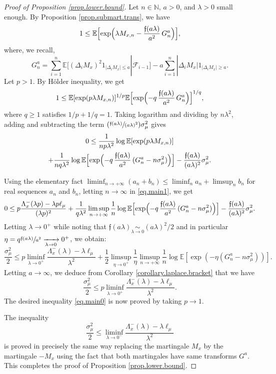 \documentclass[10pt]{amsart}
\newcommand{\Psfrac}[2]{(\sfrac{#1}{#2})}
\theoremstyle{plain}
\theoremstyle{definition}
\newcommand\E{\mathbb{E}}
\newcommand\N{\mathbb{N}}
\begin{document}
\begin{proof}[Proof of Proposition \ref{prop.lower.bound}]
Let $n\in \N$, $a>0$, and $\lambda>0$ small enough. By Proposition \ref{prop.submart.trans}, we have
\[
1\leq \E\Bigl[\exp\Bigl(\lambda M_{x,n} - \frac{\mathfrak{f}(a\lambda)}{a^2}\, G_n^a\Bigr)\Bigr],
\]
where, we recall,
\[
G_n^a=\sum_{i=1}^n \mathbb{E}[(\Delta_i M_x)^2 1_{|\Delta_i M_x| \leq a}| \mathcal{F}_{i-1}]-a\sum_{i=1}^n |\Delta_iM_x| 1_{|\Delta_i M_x| \geq a}.
\]
Let $p> 1$. By Hölder inequality, we get
\[
1\leq
\E[\exp(p\lambda M_{x,n})]^{1/p}
\E\Bigl[\exp\Bigl(- q\,\frac{\mathfrak{f}(a\lambda)}{a^2}\,G_n^a\Bigr)\Bigr]^{1/q},
\]
where $q \geq 1$ satisfies $1/p+1/q=1$.
Taking logarithm and dividing by $n\lambda^2$, adding and subtracting the term $\Psfrac{\mathfrak{f}(a\lambda)}{(a\lambda)^2}\sigma_{\mu}^2$ gives
\begin{multline}\label{eq.main1}
0\leq \frac{1}{n p \lambda^2}\log \E[\exp(p\lambda M_{x,n})]\\
+ \frac{1}{nq \lambda^2}\log \E\Bigl[\exp\Bigl(- q\,\frac{\mathfrak{f}(a\lambda)}{a^2}\, (G_n^a-n\sigma_{\mu}^2)\Bigr)\Bigr]-\frac{\mathfrak{f}(a\lambda)}{(a\lambda)^2}\sigma_{\mu}^2.
\end{multline}

Using the elementary fact $\liminf_{n\to +\infty}(a_n+b_n)\leq \liminf_n a_n + \limsup_n b_n$ for real sequences $a_n$ and $b_n$, letting $n \to \infty$ in \eqref{eq.main1}, we get
\[
0\leq p \frac{\Lambda_x^-(\lambda p)- \lambda p\ell_{\mu}}{(\lambda p)^2} + \frac{1}{ q\lambda^2}\limsup_{n\to +\infty} \frac{1}{n}\log \E\Bigl[\exp\Bigl(- q\,\frac{\mathfrak{f}(a\lambda)}{a^2}\, (G_n^a-n\sigma_{\mu}^2)\Bigr)\Bigr]- \frac{\mathfrak{f}(a\lambda)}{(a\lambda)^2}\sigma_{\mu}^2.
\]
Letting $\lambda\to 0^+$ while noting that $\mathfrak{f}(a\lambda) \underset{\lambda\to 0}{\sim} (a\lambda)^2/2$ and in particular $\eta=q\sfrac{\mathfrak{f}(a\lambda)}{a^2}\allowbreak \xrightarrow[\lambda \to 0]{} 0^+$, we obtain:
\[
\frac{\sigma_{\mu}^2}{2}\leq p \liminf_{\lambda\to 0^+}{\frac{\Lambda_x^-(\lambda)-\lambda \ell_{\mu}}{\lambda^2}}
+ \frac{1}{2}\limsup_{\eta\to 0^+}\frac{1}{\eta}
\limsup_{n\to +\infty}\frac{1}{n}\log\E[\exp(-\eta (G_n^a-n\sigma_{\mu}^2))].
\]
Letting $a \to \infty$, we deduce from Corollary \ref{corollary.laplace.bracket} that we have
\[
\frac{\sigma_\mu^2}{2} \leq p \liminf_{\lambda\to 0^+}{\frac{\Lambda_x^-(\lambda)-\lambda \ell_{\mu}}{\lambda^2}}.
\]
The desired inequality \eqref{eq.main0} is now proved by taking $p \to 1$.

The inequality
\begin{equation}\label{eq.main}
\frac{\sigma_{\mu}^2}{2}\leq \liminf_{\lambda\to 0^-}{\frac{\Lambda_x^-(\lambda)-\lambda \ell_{\mu}}{\lambda^2}}\end{equation}
is proved in precisely the same way replacing the martingale $M_{x}$ by the martingale $-M_{x}$ using the fact that both martingales have same transforms $G^a$. This completes the proof of Proposition \ref{prop.lower.bound}.
\end{proof}
\end{document}

